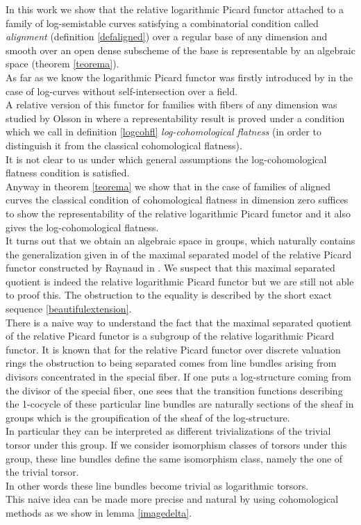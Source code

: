 \documentclass{amsart}
\theoremstyle{definition}
\numberwithin{equation}{section}
\begin{document}
\noindent In this work we show that the relative logarithmic Picard functor attached to a family of log-semistable curves satisfying a combinatorial condition called \emph{alignment} (definition \ref{defaligned}) over a regular base of any dimension and smooth over an open dense subscheme of the base is representable by an algebraic space (theorem \ref{teorema}).\\
As far as we know the logarithmic Picard functor was firstly introduced by \cite{kaj} in the case of log-curves without self-intersection over a field. \\
A relative version of this functor for families with fibers of any dimension was studied by Olsson in \cite{olpic} where a representability result is proved under a condition which we call in definition \ref{logcohfl} \emph{log-cohomological flatness} (in order to distinguish it from the classical cohomological flatness).\\
It is not clear to us under which general assumptions the log-cohomological flatness condition is satisfied.\\ 
Anyway in theorem \ref{teorema} we show that in the case of families of aligned curves the classical condition of cohomological flatness in dimension zero suffices to show the representability of the relative logarithmic Picard functor and it also gives the log-cohomological flatness.\\
\noindent It turns out that we obtain an algebraic space in groups, which naturally contains the generalization given in \cite{hol} of the maximal separated model of the relative Picard functor constructed by Raynaud in \cite{ray}. We suspect that this maximal separated quotient is indeed the relative logarithmic Picard functor but we are still not able to proof this. The obstruction to the equality is described by the short exact sequence \ref{beautifulextension}.\\

\noindent There is a naive way to understand the fact that the maximal separated quotient of the relative Picard functor is a subgroup of the relative logarithmic Picard functor.
It is known that for the relative Picard functor over discrete valuation rings the obstruction to being separated comes from line bundles arising from divisors concentrated in the special fiber. If one puts a log-structure coming from the divisor of the special fiber, one sees that the transition functions describing the 1-cocycle of these particular line bundles are naturally sections of the sheaf in groups which is the groupification of the sheaf of the log-structure. \\
In particular they can be interpreted as different trivializations of the trivial torsor under this group.
If we consider isomorphism classes of torsors under this group, these line bundles define the same isomorphism class, namely the one of the trivial torsor.\\
In other words these line bundles become trivial as logarithmic torsors. \\
This naive idea can be made more precise and natural by using cohomological methods as we show in lemma \ref{imagedelta}.\\
\end{document}
